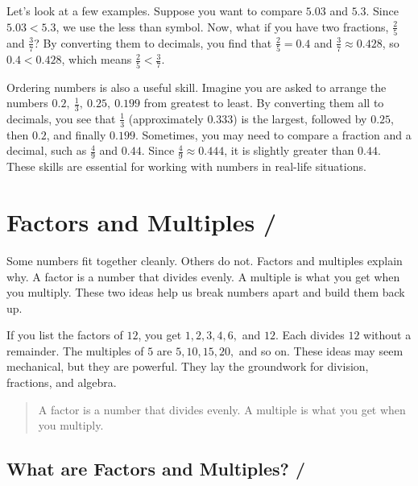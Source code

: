 Let's look at a few examples. Suppose you want to compare \(5.03\) and \(5.3\).
Since \(5.03 < 5.3\), we use the less than symbol. Now, what if you have two
fractions, \(\frac{2}{5}\) and \(\frac{3}{7}\)? By converting them to decimals,
you find that \(\frac{2}{5} = 0.4\) and \(\frac{3}{7} \approx 0.428\), so
\(0.4 < 0.428\), which means \(\frac{2}{5} < \frac{3}{7}\).

Ordering numbers is also a useful skill. Imagine you are asked to arrange the
numbers \(0.2,\ \frac{1}{3},\ 0.25,\ 0.199\) from greatest to least. By
converting them all to decimals, you see that \(\frac{1}{3}\) (approximately
\(0.333\)) is the largest, followed by \(0.25\), then \(0.2\), and finally
\(0.199\). Sometimes, you may need to compare a fraction and a decimal, such as
\(\frac{4}{9}\) and \(0.44\). Since \(\frac{4}{9} \approx 0.444\), it is slightly
greater than \(0.44\). These skills are essential for working with numbers in
real-life situations.












\newpage
\section{Factors and Multiples / }

Some numbers fit together cleanly. Others do not. Factors and multiples explain
why. A factor is a number that divides evenly. A multiple is what you get when
you multiply. These two ideas help us break numbers apart and build them back up.

If you list the factors of \(12\), you get \(1, 2, 3, 4, 6,\) and \(12\). Each
divides \(12\) without a remainder. The multiples of \(5\) are \(5, 10, 15, 20,\)
and so on. These ideas may seem mechanical, but they are powerful. They lay the
groundwork for division, fractions, and algebra.

\blockquote{A factor is a number that divides evenly. A multiple is what you get
when you multiply.}



\subsection{What are Factors and Multiples? / }

